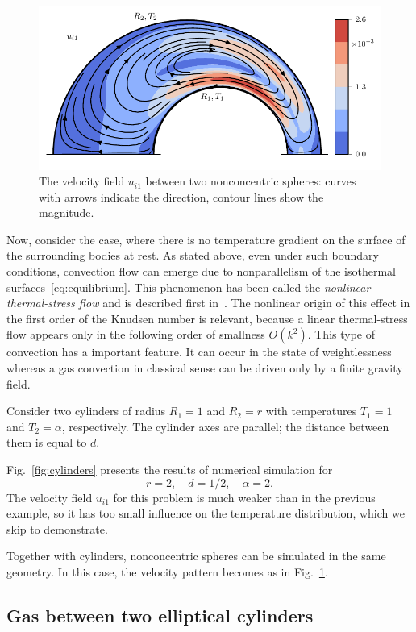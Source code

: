 \documentclass[smallextended, referee]{svjour3} %
\begin{document}
\begin{figure}
	\centering
	\includegraphics{Fig8}
	\caption{The velocity field \(u_{i1}\) between two nonconcentric spheres:
		curves with arrows indicate the direction, contour lines show the magnitude.}
	\label{fig:spheres}
\end{figure}

Now, consider the case, where there is no temperature gradient on the surface of the surrounding bodies at rest.
As stated above, even under such boundary conditions, convection flow can emerge
due to nonparallelism of the isothermal surfaces~\eqref{eq:equilibrium}.
This phenomenon has been called the \textit{nonlinear thermal-stress flow}
and is described first in~\cite{Kogan1971}.
The nonlinear origin of this effect in the first order of the Knudsen number is relevant,
because a linear thermal-stress flow appears only in the following order of smallness \(O(k^2)\).
This type of convection has a important feature. It can occur in the state of weightlessness
whereas a gas convection in classical sense can be driven only by a finite gravity field.

Consider two cylinders of radius \(R_1 = 1\) and \(R_2 = r\)
with temperatures \(T_1 = 1\) and \(T_2 = \alpha\), respectively.
The cylinder axes are parallel; the distance between them is equal to \(d\).

Fig.~\ref{fig:cylinders} presents the results of numerical simulation for
\[ r = 2, \quad d = 1/2, \quad \alpha = 2. \]
The velocity field \(u_{i1}\) for this problem is much weaker than in the previous example,
so it has too small influence on the temperature distribution, which we skip to demonstrate.

Together with cylinders, nonconcentric spheres can be simulated in the same geometry.
In this case, the velocity pattern becomes as in Fig.~\ref{fig:spheres}.

\subsection{Gas between two elliptical cylinders}
\end{document}
